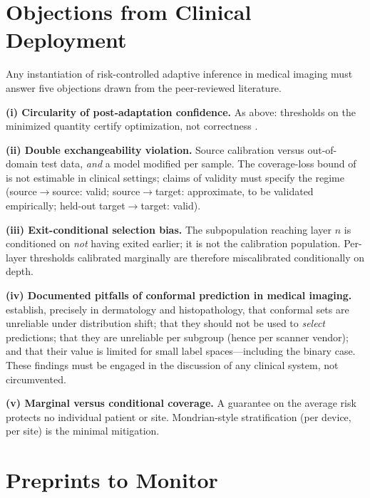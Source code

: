 \documentclass[preprint,12pt]{elsarticle}
\begin{document}
\section{Objections from Clinical Deployment}
\label{sec:clinical}

Any instantiation of risk-controlled adaptive inference in medical imaging must answer five objections drawn from the peer-reviewed literature.

\textbf{(i) Circularity of post-adaptation confidence.} As above: thresholds on the minimized quantity certify optimization, not correctness \citep{niu2023sar,lee2024deyo}.

\textbf{(ii) Double exchangeability violation.} Source calibration versus out-of-domain test data, \emph{and} a model modified per sample. The coverage-loss bound of \citet{barber2023beyond} is not estimable in clinical settings; claims of validity must specify the regime (source$\to$source: valid; source$\to$target: approximate, to be validated empirically; held-out target$\to$target: valid).

\textbf{(iii) Exit-conditional selection bias.} The subpopulation reaching layer $n$ is conditioned on \emph{not} having exited earlier; it is not the calibration population. Per-layer thresholds calibrated marginally are therefore miscalibrated conditionally on depth.

\textbf{(iv) Documented pitfalls of conformal prediction in medical imaging.} \citet{mehrtens2023pitfalls} establish, precisely in dermatology and histopathology, that conformal sets are unreliable under distribution shift; that they should not be used to \emph{select} predictions; that they are unreliable per subgroup (hence per scanner vendor); and that their value is limited for small label spaces---including the binary case. These findings must be engaged in the discussion of any clinical system, not circumvented.

\textbf{(v) Marginal versus conditional coverage.} A guarantee on the average risk protects no individual patient or site. Mondrian-style stratification (per device, per site) is the minimal mitigation.

\section{Preprints to Monitor}
\label{sec:preprints}
\end{document}
